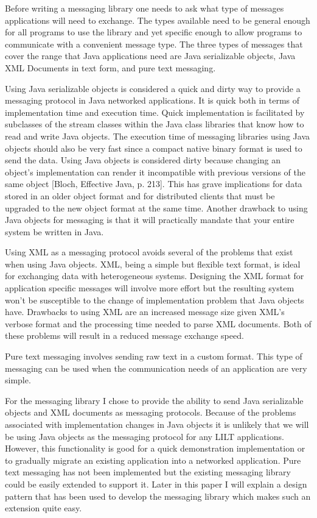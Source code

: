 \documentclass{article}
\begin{document}
Before writing a messaging library one needs to ask what type of
messages applications will need to exchange.  The types available
need to be general enough for all programs to use the
library and yet specific enough to allow programs to communicate with
a convenient message type.  The three types of messages that
cover the range that Java applications need are Java
serializable objects, Java XML Documents in text form, and pure text
messaging.

Using Java serializable objects is considered a quick and dirty way
to provide a messaging protocol in Java networked applications.
It is quick both in terms of implementation time and execution time.
Quick implementation is facilitated by subclasses of the stream
classes within the Java class libraries that know how to read and
write Java objects.  The execution time of messaging libraries using
Java objects should also be very fast since a compact  native binary format is
used to send the data.  Using Java
objects is considered dirty because changing an object's
implementation can render it incompatible with previous
versions of the same object [Bloch, Effective Java, p. 213].  This has
grave implications for data stored in an older object format and for
distributed clients that must be upgraded to the new object format at
the same time.  Another drawback to using Java objects for messaging
is that it will practically mandate that your entire system be written
in Java.

Using XML as a messaging protocol avoids several of the problems that
exist when using Java objects.  XML, being a simple but flexible text
format, is ideal for exchanging data with heterogeneous systems.
Designing the XML format for application specific messages will
involve more effort but the resulting system won't be susceptible to
the change of implementation problem that Java objects have.
Drawbacks to using XML are an increased message size given XML's
verbose format and the processing time needed to parse XML documents.
Both of these problems will result in a reduced message
exchange speed.

Pure text messaging involves sending raw text in a custom format.
This type of messaging can be used when the communication needs
of an application are very simple.

For the messaging library I chose to provide the ability to send Java
serializable objects and XML documents as messaging protocols.  Because
of the problems associated with implementation changes in Java objects
it is unlikely that we will be using Java objects as the messaging
protocol for any LILT applications.  However, this
functionality is good for a quick demonstration implementation or to
gradually migrate an existing application into a networked application.
Pure text messaging has not been implemented but the existing
messaging library could be easily extended to support it.  Later in
this paper I will explain a design pattern that has been used to
develop the messaging library which makes such an extension quite
easy.
\end{document}
